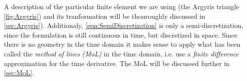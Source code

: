 A description of the particular finite element we are using (the Argyris
triangle \autoref{fig:Argyris}) and its tranformation will be thouroughly
discussed in \autoref{sec:Argyris}). Additionaly, \eqref{eqn:SemiDiscretization}
is only a semi-discretization, since the formulation is still continuous in
time, but discretized in space. Since there is no geometry in the time domain it
makes sense to apply what has been called the \emph{method of lines (MoL)} in
the time domain, i.e. use a \emph{finite difference} approximation for the time
derivative. The MoL will be discussed further in \autoref{sec:MoL}.


